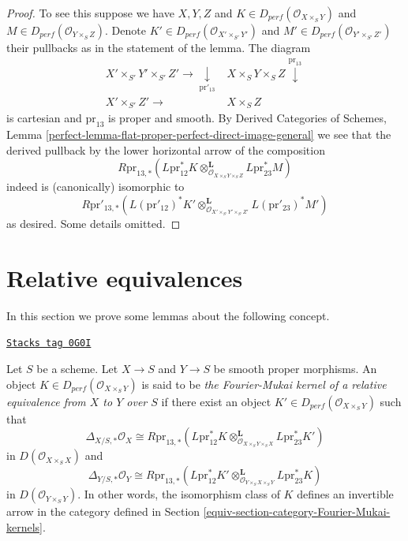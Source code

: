 \begin{proof}
To see this suppose we have $X, Y, Z$ and
$K \in D_{perf}(\mathcal{O}_{X \times_S Y})$ and
$M \in D_{perf}(\mathcal{O}_{Y \times_S Z})$.
Denote
$K' \in D_{perf}(\mathcal{O}_{X' \times_{S'} Y'})$ and
$M' \in D_{perf}(\mathcal{O}_{Y' \times_{S'} Z'})$
their pullbacks as in the statement of the lemma.
The diagram
$$
\begin{array}{cc}X' \times_{S'} Y' \times_{S'} Z' \longrightarrow\underset{\text{pr}'_{13}}{\downarrow} & X \times_S Y \times_S Z \overset{\text{pr}_{13}}{\downarrow} \\ X' \times_{S'} Z' \longrightarrow & X \times_S Z\end{array}
$$
is cartesian and $\text{pr}_{13}$ is proper and smooth.
By Derived Categories of Schemes, Lemma
\ref{perfect-lemma-flat-proper-perfect-direct-image-general}
we see that the derived pullback by the lower horizontal
arrow of the composition
$$
R\text{pr}_{13, *}(
L\text{pr}_{12}^*K
\otimes_{\mathcal{O}_{X \times_S Y \times_S Z}}^\mathbf{L}
L\text{pr}_{23}^*M)
$$
indeed is (canonically) isomorphic to
$$
R\text{pr}'_{13, *}(
L(\text{pr}'_{12})^*K'
\otimes_{\mathcal{O}_{X' \times_{S'} Y' \times_{S'} Z'}}^\mathbf{L}
L(\text{pr}'_{23})^*M')
$$
as desired. Some details omitted.
\end{proof}

\section{Relative equivalences}
\label{equiv-section-relative-equivalences}
In this section we prove some lemmas about the following concept.

\begin{definition}
\label{equiv-definition-relative-equivalence-kernel}
\href{https://stacks.math.columbia.edu/tag/0G0I}{\texttt{Stacks tag 0G0I}}

Let $S$ be a scheme. Let $X \to S$ and $Y \to S$ be smooth proper morphisms.
An object $K \in D_{perf}(\mathcal{O}_{X \times_S Y})$
is said to be {\it the Fourier-Mukai kernel of a relative equivalence
from $X$ to $Y$ over $S$}
if there exist an object $K' \in D_{perf}(\mathcal{O}_{X \times_S Y})$
such that
$$
\Delta_{X/S, *}\mathcal{O}_X \cong
R\text{pr}_{13, *}(L\text{pr}_{12}^*K
\otimes_{\mathcal{O}_{X \times_S Y \times_S X}}^\mathbf{L}
L\text{pr}_{23}^*K')
$$
in $D(\mathcal{O}_{X \times_S X})$ and
$$
\Delta_{Y/S, *}\mathcal{O}_Y \cong
R\text{pr}_{13, *}(L\text{pr}_{12}^*K'
\otimes_{\mathcal{O}_{Y \times_S X \times_S Y}}^\mathbf{L}
L\text{pr}_{23}^*K)
$$
in $D(\mathcal{O}_{Y \times_S Y})$. In other words, the isomorphism class
of $K$ defines an invertible arrow in the category defined in
Section \ref{equiv-section-category-Fourier-Mukai-kernels}.
\end{definition}

